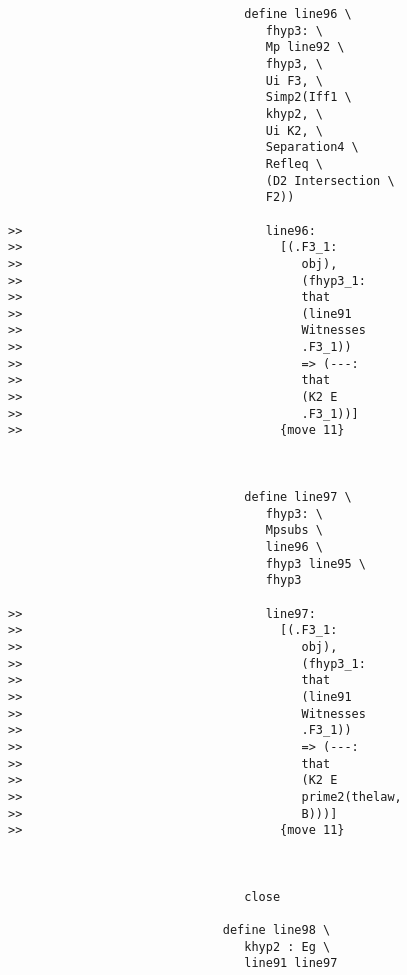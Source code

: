 \documentclass[12pt]{article}
\begin{document}
\begin{verbatim}
                                 define line96 \
                                    fhyp3: \
                                    Mp line92 \
                                    fhyp3, \
                                    Ui F3, \
                                    Simp2(Iff1 \
                                    khyp2, \
                                    Ui K2, \
                                    Separation4 \
                                    Refleq \
                                    (D2 Intersection \
                                    F2))

>>                                  line96:
>>                                    [(.F3_1:
>>                                       obj),
>>                                       (fhyp3_1:
>>                                       that
>>                                       (line91
>>                                       Witnesses
>>                                       .F3_1))
>>                                       => (---:
>>                                       that
>>                                       (K2 E
>>                                       .F3_1))]
>>                                    {move 11}



                                 define line97 \
                                    fhyp3: \
                                    Mpsubs \
                                    line96 \
                                    fhyp3 line95 \
                                    fhyp3

>>                                  line97:
>>                                    [(.F3_1:
>>                                       obj),
>>                                       (fhyp3_1:
>>                                       that
>>                                       (line91
>>                                       Witnesses
>>                                       .F3_1))
>>                                       => (---:
>>                                       that
>>                                       (K2 E
>>                                       prime2(thelaw,
>>                                       B)))]
>>                                    {move 11}



                                 close

                              define line98 \
                                 khyp2 : Eg \
                                 line91 line97



\end{verbatim}
\end{document}
